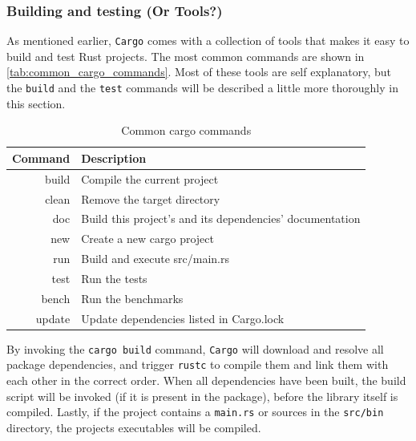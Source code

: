 \subsubsection{Building and testing (Or Tools?)}

As mentioned earlier, \texttt{Cargo} comes with a collection of tools that makes it easy to build and test Rust projects.
The most common commands are shown in \autoref{tab:common_cargo_commands}.
Most of these tools are self explanatory, but the \texttt{build} and the \texttt{test} commands will be described a little more thoroughly in this section.

\begin{table}[ht]
\begin{center}
\begin{tabular}{r|l}
\textbf{Command} & \textbf{Description}                           \\
\hline
build  & Compile the current project                              \\
clean  & Remove the target directory                              \\
doc    & Build this project's and its dependencies' documentation \\
new    & Create a new cargo project                               \\
run    & Build and execute src/main.rs                            \\
test   & Run the tests                                            \\
bench  & Run the benchmarks                                       \\
update & Update dependencies listed in Cargo.lock                 \\
\hline
\end{tabular}
\caption{Common cargo commands}
\label{tab:common_cargo_commands}
\end{center}
\end{table}

By invoking the \texttt{cargo build} command, \texttt{Cargo} will download and resolve all package dependencies, and trigger \texttt{rustc} to compile them and link them with each other in the correct order.
When all dependencies have been built, the build script will be invoked (if it is present in the package), before the library itself is compiled.
Lastly, if the project contains a \texttt{main.rs} or sources in the \texttt{src/bin} directory, the projects executables will be compiled.

